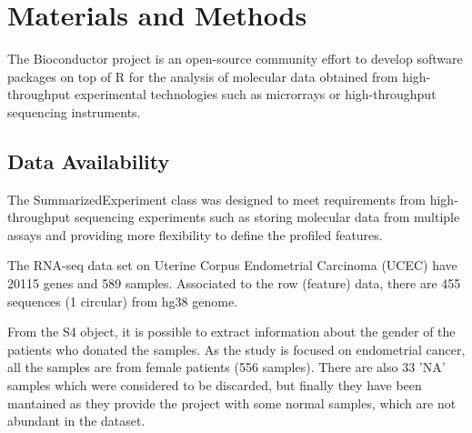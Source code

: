 \documentclass[9pt,twocolumn,twoside]{gsajnl}
\begin{document}



\section*{Materials and Methods}

The Bioconductor project \citep{Gentleman2004} is an open-source community effort to develop software packages on top of R for the analysis of molecular data obtained from high-throughput experimental technologies such as microrrays or high-throughput sequencing instruments.


\subsection*{Data Availability}
The SummarizedExperiment \citep{SummarizedExperiment} class was designed to meet requirements from high-throughput sequencing experiments such as storing molecular data from multiple assays and providing more flexibility to define the profiled features.

The RNA-seq data set on Uterine Corpus Endometrial Carcinoma (UCEC) have 20115 genes and 589 samples. Associated to the row (feature) data, there are 455 sequences (1 circular) from hg38 genome.

From the S4 object, it is possible to extract information about the gender of the patients who donated the samples. As the study is focused on endometrial cancer, all the samples are from female patients (556 samples). There are also 33 'NA' samples which were considered to be discarded, but finally they have been mantained as they provide the project with some normal samples, which are not abundant in the dataset.
\end{document}
